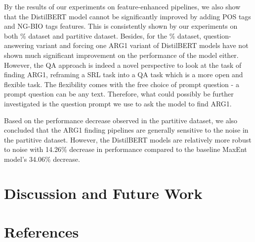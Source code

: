 \documentclass[11pt]{article}
\begin{document}
By the results of our experiments on feature-enhanced pipelines, we also show that the DistilBERT model cannot be significantly improved by adding POS tags and NG-BIO tags features. This is consistently shown by our experiments on both \% dataset and partitive dataset. Besides, for the \% dataset, question-answering variant and forcing one ARG1 variant of DistilBERT models have not shown much significant improvement on the performance of the model either. However, the QA approach is indeed a novel perspective to look at the task of finding ARG1, reframing a SRL task into a QA task which is a more open and flexible task. The flexibility comes with the free choice of prompt question - a prompt question can be any text. Therefore, what could possibly be further investigated is the question prompt we use to ask the model to find ARG1.

Based on the performance decrease observed in the partitive dataset, we also concluded that the ARG1 finding pipelines are generally sensitive to the noise in the partitive dataset. However, the DistilBERT models are relatively more robust to noise with 14.26\% decrease in performance compared to the baseline MaxEnt model's 34.06\% decrease.

\section{Discussion and Future Work}



\section*{References}



\end{document}
